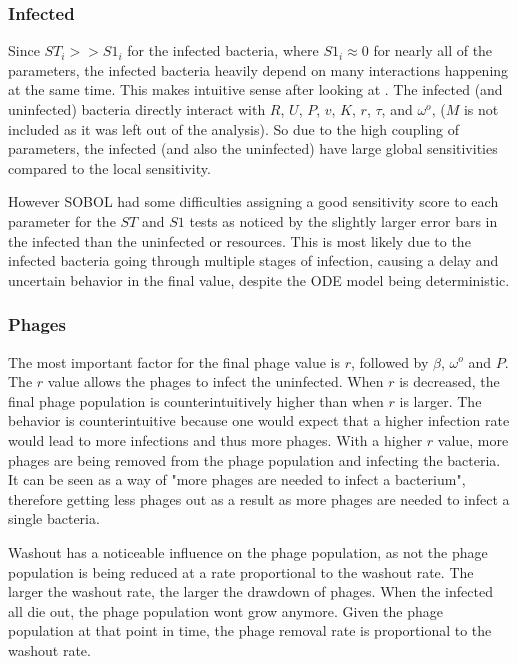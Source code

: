 \subsubsection{Infected}
Since $ST_i >> S1_i$ for the infected bacteria, where $S1_i \approx 0$ for nearly all of the parameters, the infected bacteria heavily depend on many interactions happening at the same time. 
This makes intuitive sense after looking at . 
The infected (and uninfected) bacteria directly interact with $R$, $U$, $P$, $v$, $K$, $r$, $\tau$, and $\omega^o$, ($M$ is not included as it was left out of the analysis). 
So due to the high coupling of parameters, the infected (and also the uninfected) have large global sensitivities compared to the local sensitivity. 

However SOBOL had some difficulties assigning a good sensitivity score to each parameter for the $ST$ and $S1$ tests as noticed by the slightly larger error bars in the infected than the uninfected or resources. 
This is most likely due to the infected bacteria going through multiple stages of infection, causing a delay and uncertain behavior in the final value, despite the ODE model being deterministic. 

\subsubsection{Phages}
The most important factor for the final phage value is $r$, followed by $\beta$, $\omega^o$ and $P$. 
The $r$ value allows the phages to infect the uninfected. 
When $r$ is decreased, the final phage population is counterintuitively higher than when $r$ is larger. 
The behavior is counterintuitive because one would expect that a higher infection rate would lead to more infections and thus more phages. 
With a higher $r$ value, more phages are being removed from the phage population and infecting the bacteria. 
It can be seen as a way of "more phages are needed to infect a bacterium", therefore getting less phages out as a result as more phages are needed to infect a single bacteria. 

Washout has a noticeable influence on the phage population, as not the phage population is being reduced at a rate proportional to the washout rate. 
The larger the washout rate, the larger the drawdown of phages. 
When the infected all die out, the phage population wont grow anymore. 
Given the phage population at that point in time, the phage removal rate is proportional to the washout rate. 

